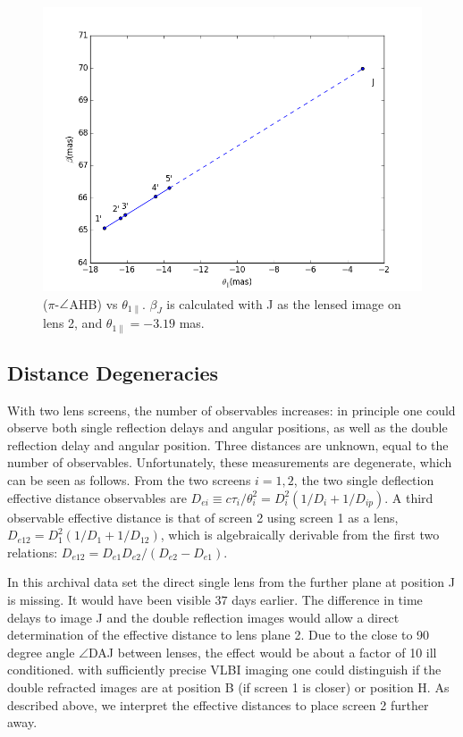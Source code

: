 \documentclass[useAMS,usenatbib]{mn2e}
\begin{document}
\begin{figure}
\centering
\includegraphics[width=1.0\linewidth]{Reflection_angle.png}
\caption{  ($\pi$-$\protect\angle$AHB) vs $\theta_{1\parallel}$.
$\beta_J$ is calculated with J as the lensed image on lens 2, and $\theta_{1\parallel}=-3.19$ mas.}
\label{vtrans}
\end{figure}

\subsection{Distance Degeneracies}
\label{sec:degeneracy}
With two lens screens, the number of observables increases: in
principle one could observe both single reflection delays and angular
positions, as well as the double reflection delay and angular
position.  Three distances are unknown, equal to the number of
observables.  Unfortunately, these measurements are degenerate, which
can be seen as follows. From the two screens $i=1,2$, the two single
deflection effective distance observables are
$D_{ei} \equiv c\tau_i/\theta_i^2=D_i^2(1/D_i+1/D_{ip})$.  A third
observable effective distance is that of screen 2 using screen 1 as a
lens, $D_{e12}=D_1^2(1/D_1+1/D_{12})$, which is algebraically
derivable from the first two relations:
$D_{e12}=D_{e1}D_{e2}/(D_{e2}-D_{e1})$.  


In this archival data set the direct single lens from the further
plane at position J is missing.  It would have been visible $37$ days
earlier.  The difference in time delays to image J and the double
reflection images would allow a direct determination of the effective
distance to lens plane 2.  Due to the close to 90 degree angle $\angle$DAJ
between lenses, the effect would be about a factor of 10 ill
conditioned.  with sufficiently precise VLBI imaging one could
distinguish if the double refracted images are at position B (if
screen 1 is closer) or position H.  As described above, we interpret
the effective distances to place screen 2 further away.
\end{document}
